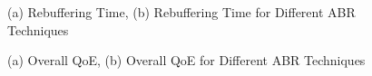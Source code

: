 \documentclass[journal,10pt]{IEEEtran}
\begin{document}
\begin{figure}
	\captionsetup[subfigure]{}
	\begin{center}
	\end{center}
	\caption{ (a) Rebuffering Time, (b) Rebuffering Time for Different ABR Techniques}
\end{figure}

\begin{figure}
	\captionsetup[subfigure]{}
	\begin{center}
	\end{center}
	\caption{(a) Overall QoE, (b) Overall QoE for Different ABR Techniques}
\end{figure}
\end{document}
